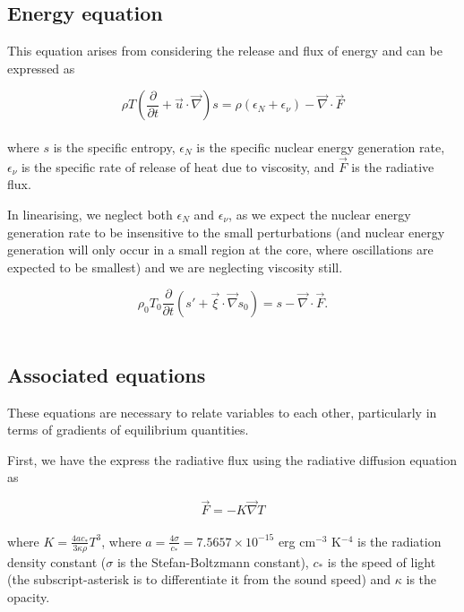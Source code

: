 \documentclass[11pt]{amsart}
\begin{document}
\subsection{Energy equation}

This equation arises from considering the release and flux of energy and can be expressed as

\begin{equation}
\rho T \left( \frac{\partial}{\partial t} + \vec{u} \cdot \vec{\nabla} \right) s =
\rho \left( \epsilon_{N} + \epsilon_{\nu} \right) - \vec{\nabla} \cdot \vec{F}
\end{equation}
\\
where $s$ is the specific entropy, $\epsilon_{N}$ is the specific nuclear energy generation rate,
$\epsilon_{\nu}$ is the specific rate of release of heat due to viscosity, and $\vec{F}$ is the radiative flux.

In linearising, we neglect both $\epsilon_{N}$ and $\epsilon_{\nu}$, as we expect the nuclear energy
generation rate to be insensitive to the small perturbations (and nuclear energy generation will only
occur in a small region at the core, where oscillations are expected to be smallest) and we are
neglecting viscosity still.

\begin{equation}
\rho_{0} T_{0} \frac{\partial}{\partial t} \left( s' + \vec{\xi} \cdot \vec{\nabla} s_{0} \right)
= s - \vec{\nabla} \cdot \vec{F}.
\end{equation}
\\

\subsection{Associated equations}

These equations are necessary to relate variables to each other, particularly in terms of gradients of
equilibrium quantities.

First, we have the express the radiative flux using the radiative diffusion equation as

\begin{equation}
\vec{F} = - K \vec{\nabla} T
\end{equation}
\\
where $K = \frac{4 a c_{*}}{3 \kappa \rho} T^{3}$, where $a = \frac{4 \sigma}{c_{*}} = 7.5657 \times 10^{-15}$ 
erg cm$^{-3}$ K$^{-4}$ is the radiation density constant ($\sigma$ is the Stefan-Boltzmann constant),
$c_{*}$ is the speed of light (the subscript-asterisk is to differentiate it from the sound speed) 
and $\kappa$ is the opacity.
\end{document}
